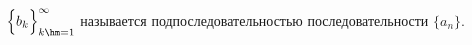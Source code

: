 
    $\Big\{b_k\Big\}_{k\hm=1}^{\infty}$ называется подпоследовательностью последовательности $\{a_n\}$.
    